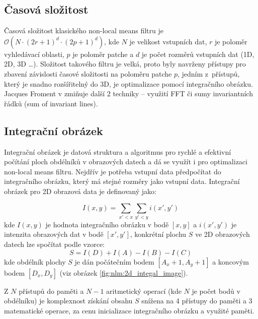 \subsection*{Časová složitost}
Časová složitost klasického non-local means filtru je $\mathcal{O}(N \cdot (2r + 1)^d \cdot (2p + 1)^d)$, kde $N$ je velikost vstupních dat, $r$ je poloměr vyhledávací oblasti, $p$ je poloměr patche a $d$ je počet rozměrů vstupních dat (1D, 2D, 3D \dots). Složitost takového filtru je velká, proto byly navrženy přístupy pro zbavení závislosti časové složitosti na poloměru patche $p$, jedním z~přístupů, který je snadno rozšířitelný do 3D, je optimalizace pomocí integračního obrázku. Jacques Froment v \cite{nlm2014:froment} zmiňuje další 2 techniky -- využití FFT či sumy invariantních řádků (sum of invariant lines). 

\subsection*{Integrační obrázek}
\label{subsec:theory:nlm:integra_image}
Integrační obrázek je datová struktura a algoritmus pro rychlé a efektivní počítání ploch obdélníků v obrazových datech \cite{wiki:integral_image} a dá se využít i pro optimalizaci non-local means filtru. Nejdřív je potřeba vstupní data předpočítat do integračního obrázku, který má stejné rozměry jako vstupní data. Integrační obrázek pro 2D obrazová data je definovaný jako:

\begin{equation}
I(x, y) = \displaystyle\sum_{x'<x}{\displaystyle\sum_{y'<y}{i(x', y')}}
\end{equation}
kde $I(x, y)$ je hodnota integračního obrázku v bodě $[x, y]$ a $i(x', y')$ je intenzita obrazových dat v bodě $[x', y']$, konkrétní plochu $S$ ve 2D obrazových datech lze spočítat podle vzorce: 
\begin{equation}
    \label{eq:2dint:area}
    S = I(D) + I(A) - I(B) - I(C)
\end{equation}
kde obdélník plochy $S$ je dán počátečním bodem $[A_x + 1, A_y + 1]$ a koncovým bodem $[D_x, D_y]$ (viz obrázek \ref{fig:nlm:2d_integal_image}).

Z $N$ přístupů do paměti a $N - 1$ aritmetický operací (kde $N$ je počet bodů v obdélníku) je komplexnost získání obsahu $S$ snížena na 4 přístupy do paměti a 3 matematické operace, za cenu inicializace integračního obrázku a využité paměti.

